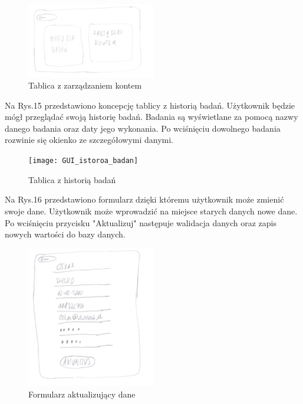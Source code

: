 \documentclass[12pt, letterpaper]{article}
\begin{document}
		
\begin{figure}[h]
  \centering
      \includegraphics[width=0.5\textwidth]{GUI_zarzadzanie_kontem}
  \caption{Tablica z zarządzaniem kontem}
\end{figure}
		
		Na Rys.15 przedstawiono koncepcję tablicy z historią badań. Użytkownik będzie mógł przeglądać  swoją historię badań. Badania są wyświetlane za pomocą nazwy danego badania oraz daty jego wykonania. Po wciśnięciu dowolnego badania rozwinie się okienko ze szczegółowymi danymi.
		
\begin{figure}[h]
  \centering
      \texttt{[image: GUI\_istoroa\_badan]}
  \caption{Tablica z historią badań}
\end{figure}
		
		Na Rys.16 przedstawiono formularz dzięki któremu użytkownik może zmienić swoje dane. Użytkownik może wprowadzić na miejsce starych danych nowe dane. Po wciśnięciu przycisku "Aktualizuj" następuje walidacja danych oraz zapis nowych wartości do bazy danych.
		
\begin{figure}[h]
  \centering
      \includegraphics[width=0.5\textwidth]{GUI_zmiana_danych}
  \caption{Formularz aktualizujący dane}
\end{figure}
		
\end{document}
